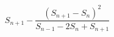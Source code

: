 \documentclass[12pt]{article}
\begin{document}
\sicpsize
\[
S_{n+1} - \frac{(S_{n+1} - S_n)^2}{S_{n-1} - 2S_n + S_{n+1}}
\]
\end{document}
